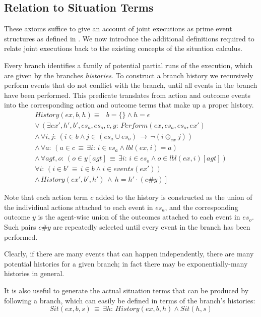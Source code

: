 \subsection{Relation to Situation Terms}

These axioms suffice to give an account of joint executions as prime
event structures as defined in \citep{npw79event_structures}. We
now introduce the additional definitions required to relate joint
executions back to the existing concepts of the situation calculus.

Every branch identifies a family of potential partial runs of the
execution, which are given by the branches \emph{histories}. To construct
a branch history we recursively perform events that do not conflict
with the branch, until all events in the branch have been performed.
This predicate translates from action and outcome events into the
corresponding action and outcome terms that make up a proper history.
\begin{gather*}
History(ex,b,h)\equiv\,\,\,\, b=\{\}\wedge h=\epsilon\\
\vee\,\left(\exists ex',h',b',es_{a},es_{o},c,y:\, Perform(ex,es_{a},es_{o},ex')\right.\\
\wedge\,\forall i,j:\,\left(i\in b\wedge j\in(es_{a}\cup es_{o})\,\rightarrow\,\neg(i\oplus_{ex}j)\right)\\
\wedge\,\forall a:\,\left(a\in c\,\equiv\,\exists i:\, i\in es_{a}\wedge lbl(ex,i)=a\right)\\
\wedge\,\forall agt,o:\,\left(o\in y[agt]\,\equiv\,\exists i:\, i\in es_{o}\wedge o\in lbl(ex,i)[agt]\right)\\
\forall i:\,\left(i\in b'\,\equiv\, i\in b\wedge i\in events(ex')\right)\\
\left.\wedge\, History(ex',b',h')\,\wedge\, h=h'\cdot(c\#y)\right]\end{gather*}


Note that each action term $c$ added to the history is constructed
as the union of the individiual actions attached to each event in
$es_{a}$, and the corresponding outcome $y$ is the agent-wise union
of the outcomes attached to each event in $es_{o}$. Such pairs $c\#y$
are repeatedly selected until every event in the branch has been performed.

Clearly, if there are many events that can happen independently, there
are many potential histories for a given branch; in fact there may
be exponentially-many histories in general.

It is also useful to generate the actual situation terms that can
be produced by following a branch, which can easily be defined in
terms of the branch's histories:\[
Sit(ex,b,s)\,\equiv\,\exists h:\, History(ex,b,h)\wedge Sit(h,s)\]



